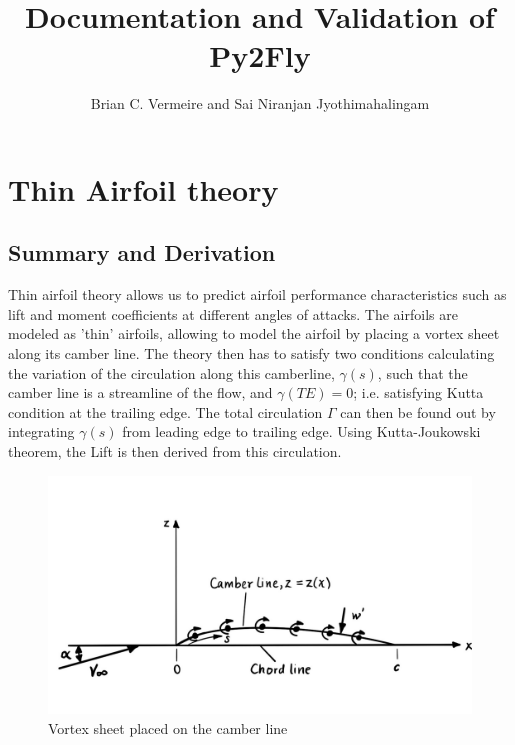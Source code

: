 \documentclass[letterpaper,12pt]{article}
\title{Documentation and Validation of Py2Fly}
\author{Brian C. Vermeire and Sai Niranjan Jyothimahalingam}
\begin{document}
\maketitle
\pagebreak

\tableofcontents
\pagebreak

\listoffigures
\pagebreak

\section{Thin Airfoil theory}
\subsection[Summary and Derivation \cite{anderson}]{Summary and Derivation \small{\cite{anderson}}}

Thin airfoil theory allows us to predict airfoil performance characteristics such as lift and moment coefficients at different angles of attacks. The airfoils are modeled as 'thin' airfoils, allowing to model the airfoil by placing a vortex sheet along its camber line. The theory then has to satisfy two conditions calculating the variation of the circulation along this camberline, $\gamma(s)$, such that the camber line is a streamline of the flow, and $\gamma(TE) = 0$; i.e. satisfying Kutta condition at the trailing edge. The total circulation $\Gamma$ can then be found out by integrating $\gamma(s)$ from leading edge to trailing edge. Using Kutta-Joukowski theorem, the Lift is then derived from this circulation.

\begin{figure}[H]
\includegraphics[scale=0.4]{1.1_vortexsheet_on_camber}
\centering
\caption{Vortex sheet placed on the camber line}
\label{v-camber}
\end{figure}
\end{document}

